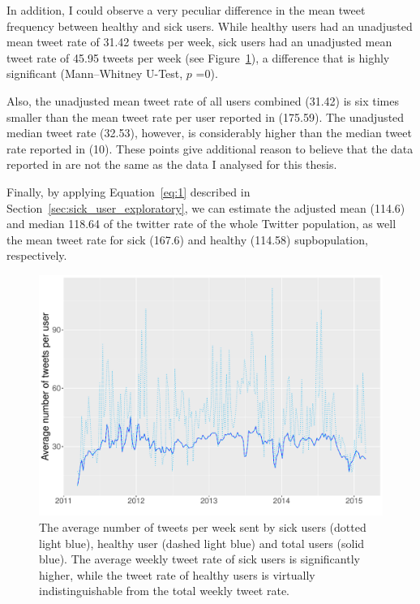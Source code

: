 \documentclass[11pt, a4paper,twoside]{report}\usepackage[]{graphicx}\usepackage[]{color}
\begin{document}
In addition, I could observe a very peculiar difference in the mean tweet frequency between healthy and sick users. While healthy users had an unadjusted mean tweet rate of 31.42 tweets per week, sick users had an unadjusted mean tweet rate of 45.95 tweets per week (see Figure~\ref{fig:avg_tw_diff}), a difference that is highly significant (Mann--Whitney U-Test, $p$ =0).

Also, the unadjusted mean tweet rate of all users combined (31.42) is six times smaller than the mean tweet rate per user reported in \cite{bodnar_data_2015} (175.59). The unadjusted median tweet rate (32.53), however, is considerably higher than the median tweet rate reported in \cite{bodnar_data_2015} (10). These points give additional reason to believe that the data reported in \cite{bodnar_data_2015} are not the same as the data I analysed for this thesis.

Finally, by applying Equation~\ref{eq:1} described in Section~\ref{sec:sick_user_exploratory}, we can estimate the adjusted mean (114.6) and median 118.64 of the twitter rate of the whole Twitter population, as well the mean tweet rate for sick (167.6) and healthy (114.58) supbopulation, respectively.\newpage

\begin{figure}[H]
\centering
\includegraphics[width=1\linewidth]{avg_tw_sick_healthy.pdf}
\caption{The average number of tweets per week sent by sick users (dotted light blue), healthy user (dashed light blue) and total users (solid blue). The average weekly tweet rate of sick users is significantly higher, while the tweet rate of healthy users is virtually indistinguishable from the total weekly tweet rate.}
\label{fig:avg_tw_diff}
\end{figure}
\end{document}
